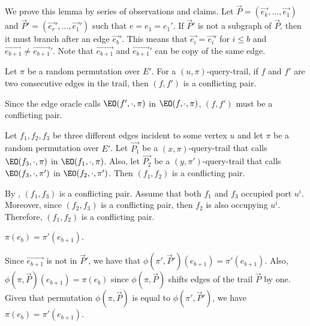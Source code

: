 We prove this lemma by series of observations and claims. Let $\vec{P} = (\vec{e_k}, \ldots, \vec{e_1})$ and $\vec{P}'=(\vec{e_r}', \ldots, \vec{e_1}')$ such that $e=e_1=e_1'$. If $\vec{P}'$ is not a subgraph of $\vec{P}$, then it must branch after an edge $\vec{e_b}'$. This means that $\vec{e_i}=\vec{e_i}'$ for $i \leq b$ and $\vec{e_{b+1}} \neq \vec{e_{b+1}}'$. Note that $\vec{e_{b+1}}$ and $\vec{e_{b+1}}'$ can be copy of the same edge. 




\begin{observation}\label{obs:cons-conf}
Let $\pi$ be a random permutation over $E'$. For a $(u, \pi)$-query-trail, if $f$ and $f'$ are two consecutive edges in the trail, then $(f, f')$ is a conflicting pair.
\end{observation}
\begin{myproof}
Since the edge oracle calls $\EO(f', \cdot,\pi)$ in $\EO(f, \cdot, \pi)$, $(f, f')$ must be a conflicting pair.
\end{myproof}

\begin{observation}\label{obs:pair-conf}
Let $f_1, f_2, f_3$ be three different edges incident to some vertex $u$ and let $\pi$ be a random permutation over $E'$. Let $\vec{P_1}$ be a $(x, \pi)$-query-trail that calls $\EO(f_3, \cdot, \pi)$ in $\EO(f_1, \cdot, \pi)$. Also, let $\vec{P_2}$ be a $(y, \pi')$-query-trail that calls $\EO(f_3, \cdot, \pi')$ in $\EO(f_2, \cdot, \pi')$. Then $(f_1, f_2)$ is a conflicting pair.
\end{observation}
\begin{myproof}
By , $(f_1, f_3)$ is a conflicting pair. Assume that both $f_1$ and $f_3$ occupied port $u^i$. Moreover, since $(f_2, f_3)$ is a conflicting pair, then $f_2$ is also occupying $u^i$. Therefore, $(f_1, f_2)$ is a conflicting pair.
\end{myproof}


\begin{observation}\label{obs:equal_edge}
$\pi(e_b) = \pi'(e_{b+1})$.
\end{observation}
\begin{myproof}
Since $\vec{e_{b+1}}$ is not in $\vec{P}'$, we have that $\phi(\pi', \vec{P}')(e_{b+1})=\pi'(e_{b+1})$. Also, $\phi(\pi, \vec{P})(e_{b+1})=\pi(e_b)$ since $\phi(\pi, \vec{P})$ shifts edges of the trail $\vec{P}$ by one. Given that permutation $\phi(\pi, \vec{P})$ is equal to $\phi(\pi', \vec{P}')$, we have $\pi(e_b) = \pi'(e_{b+1})$.
\end{myproof}

